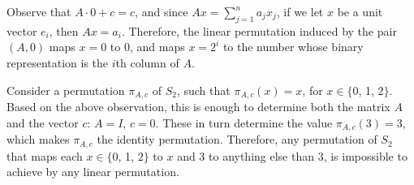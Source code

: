 Observe that $A\cdot0+c=c$, and since $Ax=\sum_{j=1}^na_jx_j$, if we let $x$ be a unit vector $e_i$, then $Ax=a_i$.
Therefore, the linear permutation induced by the pair $(A,0)$ maps $x=0$ to $0$, and maps $x=2^i$ to the number whose binary representation is the $i$th column of $A$.

Consider a permutation $\pi_{A,c}$ of $S_2$, such that $\pi_{A,c}(x)=x$, for $x\in\{0$, 1, $2\}$.
Based on the above observation, this is enough to determine both the matrix $A$ and the vector $c$: $A=I$, $c=0$.
These in turn determine the value $\pi_{A,c}(3)=3$, which makes $\pi_{A,c}$ the identity permutation.
Therefore, any permutation of $S_2$ that maps each $x\in\{0$, 1, $2\}$ to $x$ and 3 to anything else than 3, is impossible to achieve by any linear permutation.
